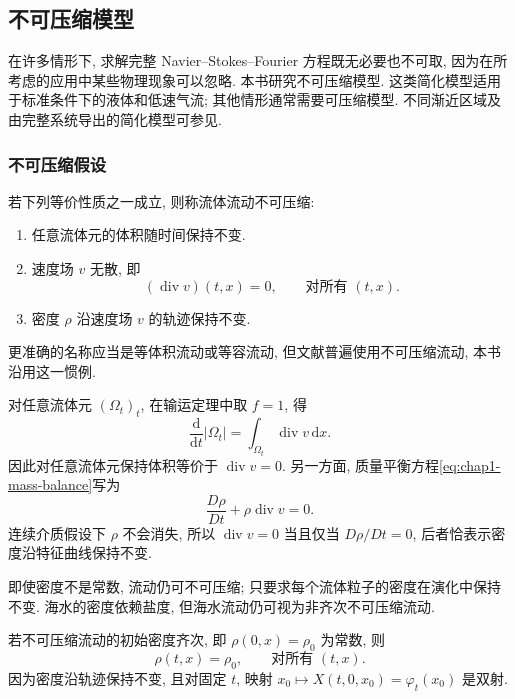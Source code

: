 \subsection{不可压缩模型}
\label{sec:chap1-incompressible-models}

在许多情形下, 求解完整 Navier--Stokes--Fourier 方程既无必要也不可取, 因为在所考虑的应用中某些物理现象可以忽略. 本书研究不可压缩模型. 这类简化模型适用于标准条件下的液体和低速气流; 其他情形通常需要可压缩模型. 不同渐近区域及由完整系统导出的简化模型可参见.

\subsubsection{不可压缩假设}
\label{subsec:chap1-incompressibility-assumption}

\begin{Proposition}
\label{prop:chap1-incompressibility-equivalences}
若下列等价性质之一成立, 则称流体流动不可压缩:
\begin{enumerate}
\item 任意流体元的体积随时间保持不变.
\item 速度场 $v$ 无散, 即
\[
  (\operatorname{div}v)(t,x)=0,\qquad\text{对所有 $(t,x)$}.
\]
\item 密度 $\rho$ 沿速度场 $v$ 的轨迹保持不变.
\end{enumerate}
更准确的名称应当是等体积流动或等容流动, 但文献普遍使用不可压缩流动, 本书沿用这一惯例.
\end{Proposition}

\begin{Proof}
对任意流体元 $(\Omega_t)_t$, 在输运定理中取 $f=1$, 得
\[
  \frac{\mathrm{d}}{\mathrm{d}t}|\Omega_t|=\int_{\Omega_t}\operatorname{div}v\,\mathrm{d}x.
\]
因此对任意流体元保持体积等价于 $\operatorname{div}v=0$. 另一方面, 质量平衡方程\eqref{eq:chap1-mass-balance}写为
\[
  \frac{D\rho}{Dt}+\rho\operatorname{div}v=0.
\]
连续介质假设下 $\rho$ 不会消失, 所以 $\operatorname{div}v=0$ 当且仅当 $D\rho/Dt=0$, 后者恰表示密度沿特征曲线保持不变.
\end{Proof}

\begin{Remark}
\label{rem:chap1-incompressible-nonhomogeneous}
即使密度不是常数, 流动仍可不可压缩; 只要求每个流体粒子的密度在演化中保持不变. 海水的密度依赖盐度, 但海水流动仍可视为非齐次不可压缩流动.
\end{Remark}

\begin{Remark}
\label{rem:chap1-incompressible-homogeneous}
若不可压缩流动的初始密度齐次, 即 $\rho(0,x)=\rho_0$ 为常数, 则
\[
  \rho(t,x)=\rho_0,\qquad\text{对所有 $(t,x)$}.
\]
因为密度沿轨迹保持不变, 且对固定 $t$, 映射 $x_0\mapsto X(t,0,x_0)=\varphi_t(x_0)$ 是双射.
\end{Remark}

